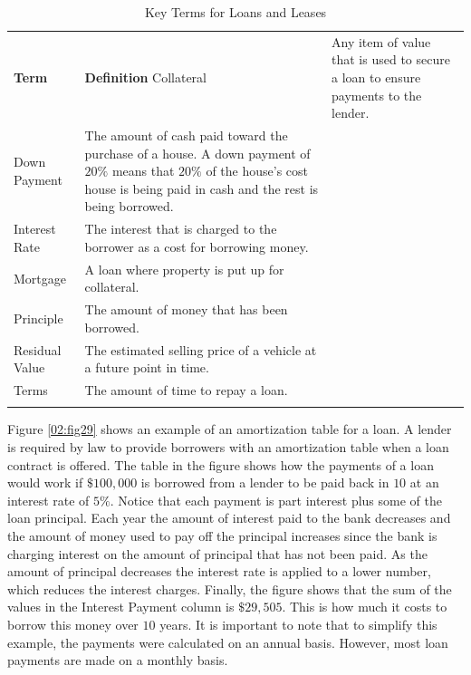\begin{table}[H]
	{\small
		\begin{longtable}{L{0.75in}L{3.50in}} %
			\textbf{Term} & \textbf{Definition} \endhead
			\hline
			Collateral & Any item of value that is used to secure a loan to ensure payments to the lender.\\
			Down Payment & The amount of cash paid toward the purchase of a house. A down payment of $ 20\% $ means that $ 20\% $ of the house's cost house is being paid in cash and the rest is being borrowed.\\
			Interest Rate & The interest that is charged to the borrower as a cost for borrowing money.\\
			Mortgage & A loan where property is put up for collateral.\\
			Principle & The amount of money that has been borrowed.\\
			Residual Value & The estimated selling price of a vehicle at a future point in time.\\
			Terms & The amount of time to repay a loan.\\
			\caption{Key Terms for Loans and Leases}
			\label{02:tab05}
		\end{longtable}
	} %
\end{table}

Figure \ref{02:fig29} shows an example of an amortization table for a loan. A lender is required by law to provide borrowers with an amortization table when a loan contract is offered. The table in the figure shows how the payments of a loan would work if $ \$100,000 $ is borrowed from a lender to be paid back in $ 10 $ at an interest rate of $ 5\% $. Notice that each payment is part interest plus some of the loan principal. Each year the amount of interest paid to the bank decreases and the amount of money used to pay off the principal increases since the bank is charging interest on the amount of principal that has not been paid. As the amount of principal decreases the interest rate is applied to a lower number, which reduces the interest charges. Finally, the figure shows that the sum of the values in the Interest Payment column is $ \$29,505 $. This is how much it costs to borrow this money over $ 10 $ years. It is important to note that to simplify this example, the payments were calculated on an annual basis. However, most loan payments are made on a monthly basis.

